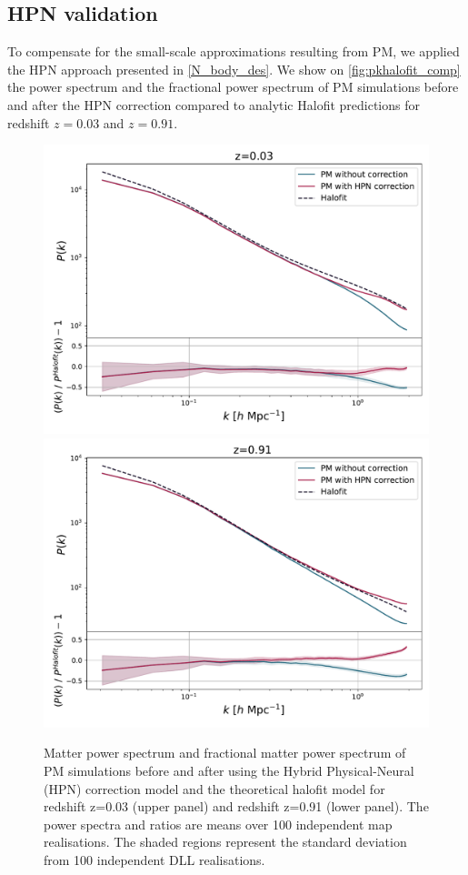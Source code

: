 \documentclass[twocolumn,twocolappendix]{aastex63}
\begin{document}
\subsection{HPN validation }
To compensate for the small-scale approximations resulting from PM, we applied the HPN approach presented in \autoref{N_body_des}. 
We show on \autoref{fig:pkhalofit_comp} the power spectrum  and the fractional power spectrum of PM simulations before and after the HPN correction compared to analytic Halofit predictions \citep{smith2003stable, takahashi2012revising} for redshift $z=0.03$ and $z=0.91$.
\begin{figure}
    \centering
    \includegraphics[width=\columnwidth]{paper/figures/residual_pk_z0_zoom.pdf}
    \includegraphics[width=\columnwidth]{paper/figures/residual_pk_z1_zoom.pdf}
    \caption{
     Matter power spectrum and fractional matter power spectrum of PM simulations before and after using the Hybrid Physical-Neural (HPN) correction model and the theoretical halofit model for redshift z=0.03 (upper panel) and redshift z=0.91 (lower panel). The power
spectra and ratios are means over 100 independent map realisations. The shaded regions represent the standard deviation from 100 independent DLL realisations.
    }
    \label{fig:pkhalofit_comp}
\end{figure}
\end{document}
